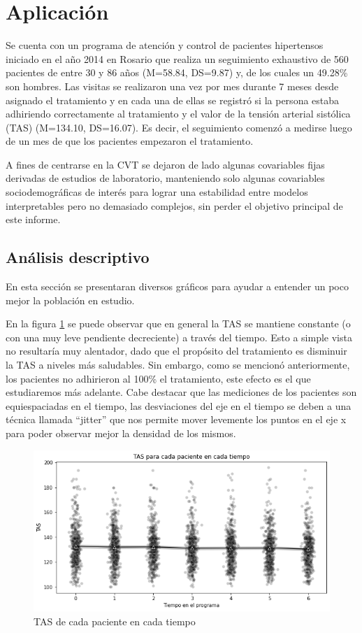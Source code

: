 \documentclass[spanish]{article}
\numberwithin{figure}{subsection}
\numberwithin{equation}{subsection}
\numberwithin{table}{subsection}
\def\npatients{560}
\begin{document}
\newpage

\section{Aplicación}

Se cuenta con un programa de atención y control de pacientes hipertensos
iniciado en el año 2014 en Rosario que realiza un seguimiento exhaustivo de
\npatients{} pacientes de entre 30 y 86 años (M=58.84, DS=9.87) y, de los cuales
un 49.28\% son hombres. Las visitas se realizaron una vez por mes durante 7
meses desde asignado el tratamiento y en cada una de ellas se registró si la
persona estaba adhiriendo correctamente al tratamiento y el valor de la tensión
arterial sistólica (TAS) (M=134.10, DS=16.07). Es decir, el seguimiento comenzó
a medirse luego de un mes de que los pacientes empezaron el tratamiento.

A fines de centrarse en la CVT se dejaron de lado algunas covariables fijas
derivadas de estudios de laboratorio, manteniendo solo algunas covariables
sociodemográficas de interés para lograr una estabilidad entre modelos
interpretables pero no demasiado complejos, sin perder el objetivo principal de
este informe.

\subsection{Análisis descriptivo}

En esta sección se presentaran diversos gráficos para ayudar a entender un poco
mejor la población en estudio.

En la figura \ref{TAS_vs_tpo} se puede observar que en general la TAS se
mantiene constante (o con una muy leve pendiente decreciente) a través del
tiempo. Esto a simple vista no resultaría muy alentador, dado que el propósito
del tratamiento es disminuir la TAS a niveles más saludables. Sin embargo, como
se mencionó anteriormente, los pacientes no adhirieron al 100\% el tratamiento,
este efecto es el que estudiaremos más adelante. Cabe destacar que las
mediciones de los pacientes son equiespaciadas en el tiempo, las desviaciones
del eje en el tiempo se deben a una técnica llamada ``jitter'' que nos permite
mover levemente los puntos en el eje x para poder observar mejor la densidad de
los mismos. 

\begin{figure}[H]
	\centering
	\includegraphics[scale=0.5]{img/TAS_vs_tpo.png}
	\caption{TAS de cada paciente en cada tiempo}
	\label{TAS_vs_tpo}
\end{figure}
\end{document}
